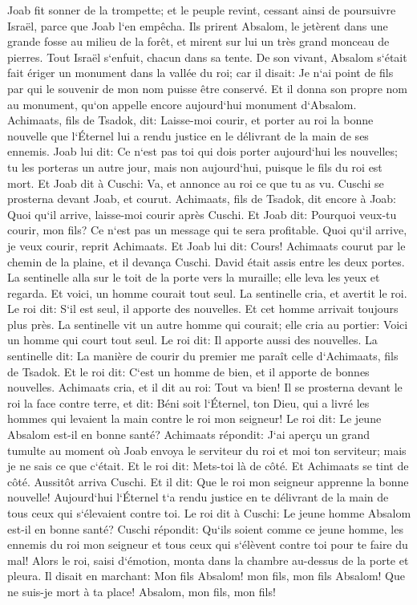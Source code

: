 \verse Joab fit sonner de la trompette; et le peuple revint, cessant ainsi de poursuivre Israël, parce que Joab l`en empêcha. 
\verse Ils prirent Absalom, le jetèrent dans une grande fosse au milieu de la forêt, et mirent sur lui un très grand monceau de pierres. Tout Israël s`enfuit, chacun dans sa tente. 
\verse De son vivant, Absalom s`était fait ériger un monument dans la vallée du roi; car il disait: Je n`ai point de fils par qui le souvenir de mon nom puisse être conservé. Et il donna son propre nom au monument, qu`on appelle encore aujourd`hui monument d`Absalom. 
\verse Achimaats, fils de Tsadok, dit: Laisse-moi courir, et porter au roi la bonne nouvelle que l`Éternel lui a rendu justice en le délivrant de la main de ses ennemis. 
\verse Joab lui dit: Ce n`est pas toi qui dois porter aujourd`hui les nouvelles; tu les porteras un autre jour, mais non aujourd`hui, puisque le fils du roi est mort. 
\verse Et Joab dit à Cuschi: Va, et annonce au roi ce que tu as vu. Cuschi se prosterna devant Joab, et courut. 
\verse Achimaats, fils de Tsadok, dit encore à Joab: Quoi qu`il arrive, laisse-moi courir après Cuschi. Et Joab dit: Pourquoi veux-tu courir, mon fils? Ce n`est pas un message qui te sera profitable. 
\verse Quoi qu`il arrive, je veux courir, reprit Achimaats. Et Joab lui dit: Cours! Achimaats courut par le chemin de la plaine, et il devança Cuschi. 
\verse David était assis entre les deux portes. La sentinelle alla sur le toit de la porte vers la muraille; elle leva les yeux et regarda. Et voici, un homme courait tout seul. 
\verse La sentinelle cria, et avertit le roi. Le roi dit: S`il est seul, il apporte des nouvelles. Et cet homme arrivait toujours plus près. 
\verse La sentinelle vit un autre homme qui courait; elle cria au portier: Voici un homme qui court tout seul. Le roi dit: Il apporte aussi des nouvelles. 
\verse La sentinelle dit: La manière de courir du premier me paraît celle d`Achimaats, fils de Tsadok. Et le roi dit: C`est un homme de bien, et il apporte de bonnes nouvelles. 
\verse Achimaats cria, et il dit au roi: Tout va bien! Il se prosterna devant le roi la face contre terre, et dit: Béni soit l`Éternel, ton Dieu, qui a livré les hommes qui levaient la main contre le roi mon seigneur! 
\verse Le roi dit: Le jeune Absalom est-il en bonne santé? Achimaats répondit: J`ai aperçu un grand tumulte au moment où Joab envoya le serviteur du roi et moi ton serviteur; mais je ne sais ce que c`était. 
\verse Et le roi dit: Mets-toi là de côté. Et Achimaats se tint de côté. 
\verse Aussitôt arriva Cuschi. Et il dit: Que le roi mon seigneur apprenne la bonne nouvelle! Aujourd`hui l`Éternel t`a rendu justice en te délivrant de la main de tous ceux qui s`élevaient contre toi. 
\verse Le roi dit à Cuschi: Le jeune homme Absalom est-il en bonne santé? Cuschi répondit: Qu`ils soient comme ce jeune homme, les ennemis du roi mon seigneur et tous ceux qui s`élèvent contre toi pour te faire du mal! 
\verse Alors le roi, saisi d`émotion, monta dans la chambre au-dessus de la porte et pleura. Il disait en marchant: Mon fils Absalom! mon fils, mon fils Absalom! Que ne suis-je mort à ta place! Absalom, mon fils, mon fils! 

